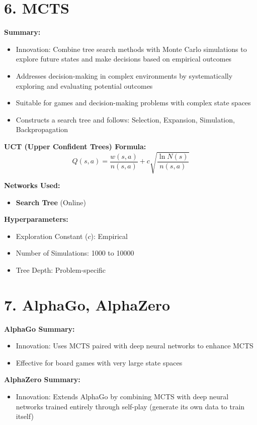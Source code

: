 \documentclass[a4paper,10pt]{article}
\begin{document}
\begin{multicols}{2}
\section*{6. MCTS}
\textbf{Summary:}
\begin{itemize}
    \item Innovation: Combine tree search methods with Monte Carlo simulations to explore future states and make decisions based on empirical outcomes
    \item Addresses decision-making in complex environments by systematically exploring and evaluating potential outcomes
    \item Suitable for games and decision-making problems with complex state spaces
    \item Constructs a search tree and follows: Selection, Expansion, Simulation, Backpropagation
\end{itemize}

\noindent \textbf{UCT (Upper Confident Trees) Formula:}
\[
Q(s, a) = \frac{w(s, a)}{n(s, a)} + c \sqrt{\frac{\ln N(s)}{n(s, a)}}
\]

\noindent \textbf{Networks Used:}
\begin{itemize}
    \item \textbf{Search Tree} (Online)
\end{itemize}

\noindent \textbf{Hyperparameters:}
\begin{itemize}
    \item Exploration Constant (\(c\)): Empirical
    \item Number of Simulations: 1000 to 10000
    \item Tree Depth: Problem-specific
\end{itemize}

\section*{7. AlphaGo, AlphaZero}
\textbf{AlphaGo Summary:}
\begin{itemize}
    \item Innovation: Uses MCTS paired with deep neural networks to enhance MCTS
    \item Effective for board games with very large state spaces
\end{itemize}

\noindent \textbf{AlphaZero Summary:}
\begin{itemize}
    \item Innovation: Extends AlphaGo by combining MCTS with deep neural networks trained entirely through self-play (generate its own data to train itself)
\end{itemize}


\end{multicols}
\end{document}

